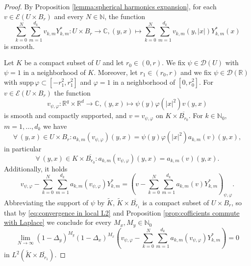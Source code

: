 \documentclass[a4paper,10pt]{amsart}
\newtheorem*{crucial lemma}{Lemma \ref{lem:nice polynomial2}}
\theoremstyle{definition}
\newcommand{\R}{\mathbb{R}}
\newcommand{\C}{\mathbb{C}}
\newcommand{\N}{\mathbb{N}}
\newcommand{\supp}{\mbox{supp}\,}
\begin{document}
\begin{proof}
	By Proposition \ref{lemma:spherical harmonics expansion}, for each $v\in\mathscr{E}(U\times B_r)$ and every $N\in \N$, the function
	\[\sum_{k=0}^N\sum_{m=1}^{d_k} v_{k,m} Y_{k,m}^*:U\times B_r\rightarrow\C, (y,x)\mapsto \sum_{k=0}^N\sum_{m=1}^{d_k} v_{k,m}(y,|x|) Y_{k,m}^*(x)\]
	is smooth.
	
	Let $K$ be a compact subset of $U$ and let $r_0\in (0,r)$. We fix $\psi\in \mathscr{D}(U)$ with $\psi=1$ in a neighborhood of $K$. Moreover, let $r_1\in(r_0,r)$ and we fix $\psi\in \mathscr{D}(\R)$ with $\supp\varphi\subset [-r_1^2,r_1^2]$ and $\varphi=1$ in a neighborhood of $[0,r_0^2]$. For $v\in\mathscr{E}(U\times B_r)$ the function
	\[v_{\psi,\varphi}\colon \R^q\times\R^d\rightarrow\C, (y,x)\mapsto \psi(y)\varphi(|x|^2)v(y,x)\]
	is smooth and compactly supported, and $v=v_{\psi,\varphi}$ on $K\times \overline{B_{r_0}}$. For $k\in \N_0$, $m=1,\ldots,d_k$ we have
	\[\forall\,(y,x)\in U\times B_r\colon a_{k,m}\left(v_{\psi,\varphi}\right)(y,x)=\psi(y)\varphi(|x|^2)a_{k,m}(v)(y,x),\]
	in particular
	\[\forall\,(y,x)\in K\times \overline{B_{r_0}}\colon a_{k,m}\left(v_{\psi,\varphi}\right)(y,x)=a_{k,m}(v)(y,x).\]
	Additionally, it holds
	\begin{equation}\label{eq:commutation of psi, varphi}
		v_{\psi,\varphi}-\sum_{k=0}^N\sum_{m=1}^{d_k}a_{k,m}(v_{\psi,\varphi})Y_{k,m}^*=\left(v-\sum_{k=0}^N\sum_{m=1}^{d_k}a_{k,m}(v)Y_{k,m}^*\right)_{\psi,\varphi}.
	\end{equation}
	Abbreviating the support of $\psi$ by $\tilde{K}$, $\tilde{K}\times\overline{B_{r_1}}$ is a compact subset of $U\times B_r$, so that by \eqref{eq:convergence in local L2} and Proposition \ref{prop:cofficients commute with Laplace} we conclude for every $M_x,M_y\in \N_0$
	\begin{equation}\label{eq:local L2-convergence}
		\lim_{N\rightarrow\infty}(1-\Delta_y)^{M_y}(1-\Delta_x)^{M_x}\left(v_{\psi,\varphi}-\sum_{k=0}^N\sum_{m=1}^{d_k}a_{k,m}(v_{\psi,\varphi})Y_{k,m}^*\right)=0
	\end{equation}
	in $L^2(\tilde{K}\times\overline{B_{r_1}})$. 
	

\end{proof}
\end{document}
